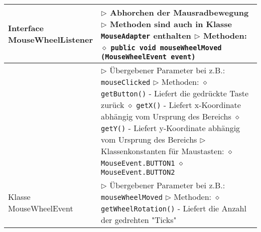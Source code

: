 \begin{longtable}{ | p{} p{} | }
	\makecell[l]{Interface \\ MouseWheelListener} & \makecell[l]{
	$\rhd$ Abhorchen der Mausradbewegung \\
	$\rhd$ Methoden sind auch in Klasse \texttt{MouseAdapter} enthalten \\
	$\rhd$ Methoden: \\
	\hspace{0.4cm} $\diamond$ \texttt{public void mouseWheelMoved (MouseWheelEvent event)}} \\ \hline

	\makecell[l]{Klasse MouseEvent} & \makecell[l]{
	$\rhd$ Übergebener Parameter bei z.B.: \texttt{mouseClicked} \\
	$\rhd$ Methoden: \\
	\hspace{0.4cm} $\diamond$ \texttt{getButton()} \\
	\hspace{0.6cm} - Liefert die gedrückte Taste zurück \\
	\hspace{0.4cm} $\diamond$ \texttt{getX()} \\
	\hspace{0.6cm} - Liefert x-Koordinate abhängig vom Ursprung des Bereichs \\
	\hspace{0.4cm} $\diamond$ \texttt{getY()} \\
	\hspace{0.6cm} - Liefert y-Koordinate abhängig vom Ursprung des Bereichs \\
	$\rhd$ Klassenkonstanten für Maustasten: \\
	\hspace{0.4cm} $\diamond$ \texttt{MouseEvent.BUTTON1} \\
	\hspace{0.4cm} $\diamond$ \texttt{MouseEvent.BUTTON2}} \\ \hline

	\makecell[l]{Klasse \\ MouseWheelEvent} & \makecell[l]{
	$\rhd$ Übergebener Parameter bei z.B.: \texttt{mouseWheelMoved} \\
	$\rhd$ Methoden: \\
	\hspace{0.4cm} $\diamond$ \texttt{getWheelRotation()} \\
	\hspace{0.6cm} - Liefert die Anzahl der gedrehten "Ticks"  } \\ \hline


\end{longtable}
